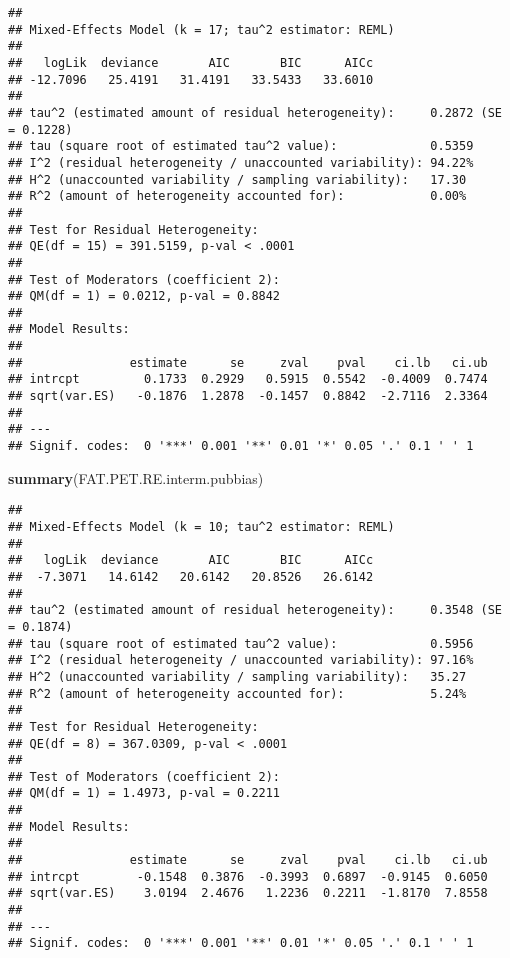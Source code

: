 \documentclass[]{book}
\newenvironment{Shaded}{\begin{snugshade}}{\end{snugshade}}
\newcommand{\KeywordTok}[1]{\textcolor[rgb]{0.13,0.29,0.53}{\textbf{#1}}}
\newcommand{\NormalTok}[1]{#1}
\theoremstyle{definition}
\theoremstyle{definition}
\theoremstyle{definition}
\theoremstyle{remark}
\begin{document}
\begin{verbatim}
## 
## Mixed-Effects Model (k = 17; tau^2 estimator: REML)
## 
##   logLik  deviance       AIC       BIC      AICc 
## -12.7096   25.4191   31.4191   33.5433   33.6010   
## 
## tau^2 (estimated amount of residual heterogeneity):     0.2872 (SE = 0.1228)
## tau (square root of estimated tau^2 value):             0.5359
## I^2 (residual heterogeneity / unaccounted variability): 94.22%
## H^2 (unaccounted variability / sampling variability):   17.30
## R^2 (amount of heterogeneity accounted for):            0.00%
## 
## Test for Residual Heterogeneity:
## QE(df = 15) = 391.5159, p-val < .0001
## 
## Test of Moderators (coefficient 2):
## QM(df = 1) = 0.0212, p-val = 0.8842
## 
## Model Results:
## 
##               estimate      se     zval    pval    ci.lb   ci.ub 
## intrcpt         0.1733  0.2929   0.5915  0.5542  -0.4009  0.7474    
## sqrt(var.ES)   -0.1876  1.2878  -0.1457  0.8842  -2.7116  2.3364    
## 
## ---
## Signif. codes:  0 '***' 0.001 '**' 0.01 '*' 0.05 '.' 0.1 ' ' 1
\end{verbatim}

\begin{Shaded}
\begin{Highlighting}[]
\KeywordTok{summary}\NormalTok{(FAT.PET.RE.interm.pubbias)}
\end{Highlighting}
\end{Shaded}

\begin{verbatim}
## 
## Mixed-Effects Model (k = 10; tau^2 estimator: REML)
## 
##   logLik  deviance       AIC       BIC      AICc 
##  -7.3071   14.6142   20.6142   20.8526   26.6142   
## 
## tau^2 (estimated amount of residual heterogeneity):     0.3548 (SE = 0.1874)
## tau (square root of estimated tau^2 value):             0.5956
## I^2 (residual heterogeneity / unaccounted variability): 97.16%
## H^2 (unaccounted variability / sampling variability):   35.27
## R^2 (amount of heterogeneity accounted for):            5.24%
## 
## Test for Residual Heterogeneity:
## QE(df = 8) = 367.0309, p-val < .0001
## 
## Test of Moderators (coefficient 2):
## QM(df = 1) = 1.4973, p-val = 0.2211
## 
## Model Results:
## 
##               estimate      se     zval    pval    ci.lb   ci.ub 
## intrcpt        -0.1548  0.3876  -0.3993  0.6897  -0.9145  0.6050    
## sqrt(var.ES)    3.0194  2.4676   1.2236  0.2211  -1.8170  7.8558    
## 
## ---
## Signif. codes:  0 '***' 0.001 '**' 0.01 '*' 0.05 '.' 0.1 ' ' 1
\end{verbatim}
\end{document}
